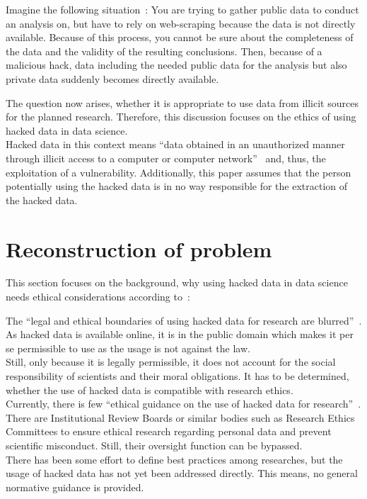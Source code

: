 
Imagine the following situation~\parencite[][1-2]{patreon}:
You are trying to gather public data to conduct an analysis on, but have to rely on web-scraping because the data is not directly available.
Because of this process, you cannot be sure about the completeness of the data and the validity of the resulting conclusions.
Then, because of a malicious hack, data including the needed public data for the analysis but also private data suddenly becomes directly available.

The question now arises, whether it is appropriate to use data from illicit sources for the planned research.
Therefore, this discussion focuses on the ethics of using hacked data in data science.\\
Hacked data in this context means ``data obtained in an unauthorized manner through illicit access to a computer or computer network''~\parencite[][744]{nature} and, thus, the exploitation of a vulnerability.
Additionally, this paper assumes that the person potentially using the hacked data is in no way responsible for the extraction of the hacked data.

\section*{Reconstruction of problem}

This section focuses on the background, why using hacked data in data science needs ethical considerations according to~\textcite[][745]{nature}:

The ``legal and ethical boundaries of using hacked data for research are blurred''~\parencite[][745]{nature}.
As hacked data is available online, it is in the public domain which makes it per se permissible to use as the usage is not against the law.\\
Still, only because it is legally permissible, it does not account for the social responsibility of scientists and their moral obligations.
It has to be determined, whether the use of hacked data is compatible with research ethics.\\
Currently, there is few ``ethical guidance on the use of hacked data for research''~\parencite[][745]{nature}.
There are Institutional Review Boards or similar bodies such as Research Ethics Committees to ensure ethical research regarding personal data and prevent scientific misconduct.
Still, their oversight function can be bypassed.\\
There has been some effort to define best practices among researches, but the usage of hacked data has not yet been addressed directly.
This means, no general normative guidance is provided.

